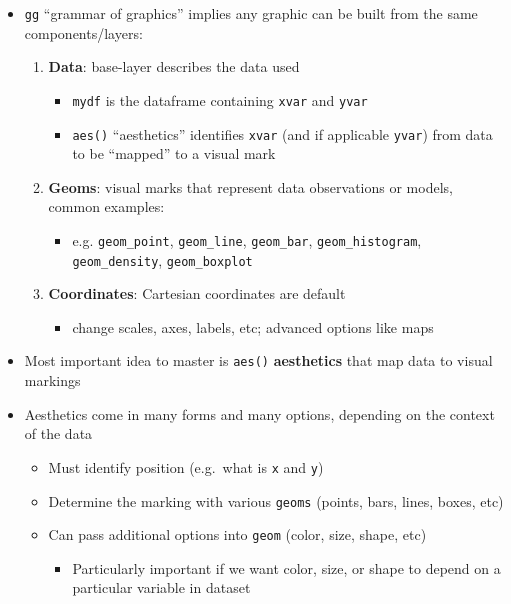 \documentclass[]{book}
\providecommand{\tightlist}{%
  \setlength{\itemsep}{0pt}\setlength{\parskip}{0pt}}
\theoremstyle{definition}
\theoremstyle{definition}
\theoremstyle{definition}
\theoremstyle{remark}
\begin{document}
\begin{itemize}
\tightlist
\item
  \texttt{gg} ``grammar of graphics'' implies any graphic can be built
  from the same components/layers:

  \begin{enumerate}
  \def\labelenumi{\arabic{enumi}.}
  \tightlist
  \item
    \textbf{Data}: base-layer describes the data used

    \begin{itemize}
    \tightlist
    \item
      \texttt{mydf} is the dataframe containing \texttt{xvar} and
      \texttt{yvar}
    \item
      \texttt{aes()} ``aesthetics'' identifies \texttt{xvar} (and if
      applicable \texttt{yvar}) from data to be ``mapped'' to a visual
      mark
    \end{itemize}
  \item
    \textbf{Geoms}: visual marks that represent data observations or
    models, common examples:

    \begin{itemize}
    \tightlist
    \item
      e.g. \texttt{geom\_point}, \texttt{geom\_line},
      \texttt{geom\_bar}, \texttt{geom\_histogram},
      \texttt{geom\_density}, \texttt{geom\_boxplot}
    \end{itemize}
  \item
    \textbf{Coordinates}: Cartesian coordinates are default

    \begin{itemize}
    \tightlist
    \item
      change scales, axes, labels, etc; advanced options like maps
    \end{itemize}
  \end{enumerate}
\item
  Most important idea to master is \texttt{aes()} \textbf{aesthetics}
  that map data to visual markings
\item
  Aesthetics come in many forms and many options, depending on the
  context of the data

  \begin{itemize}
  \tightlist
  \item
    Must identify position (e.g.~what is \texttt{x} and \texttt{y})
  \item
    Determine the marking with various \texttt{geoms} (points, bars,
    lines, boxes, etc)
  \item
    Can pass additional options into \texttt{geom} (color, size, shape,
    etc)

    \begin{itemize}
    \tightlist
    \item
      Particularly important if we want color, size, or shape to depend
      on a particular variable in dataset
    \end{itemize}
  \end{itemize}
\end{itemize}
\end{document}
